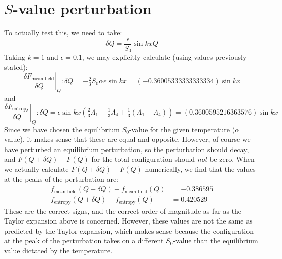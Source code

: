 \documentclass[reqno]{article}
\begin{document}
\section{$S$-value perturbation}
To actually test this, we need to take:
\begin{equation}
    \delta Q
    =
    \frac{\epsilon}{S_0} \sin kx Q
\end{equation}
Taking $k = 1$ and $\epsilon = 0.1$, we may explicitly calculate (using values previously stated):
\begin{equation}
    \left. \frac{\delta F_\text{mean field}}{\delta Q} \right|_Q : \delta Q
    =
    -\tfrac23 S_0 \alpha \epsilon \sin kx 
    =
    (-0.36005333333333334) \sin kx
\end{equation}
and
\begin{equation}
    \left. \frac{\delta F_\text{entropy}}{\delta Q} \right|_Q : \delta Q
    =
    \epsilon \sin kx \left( \tfrac23 \Lambda_1 - \tfrac13 \Lambda_4 + \tfrac13 (\Lambda_1 + \Lambda_4) \right)
    =
    (0.3600595216363576) \sin kx
\end{equation}
Since we have chosen the equilibrium $S_0$-value for the given temperature ($\alpha$ value), it makes sense that these are equal and opposite.
However, of course we have perturbed an equilibrium perturbation, so the perturbation should decay, and $F(Q + \delta Q) - F(Q)$ for the total configuration should \textit{not} be zero.
When we actually calculate $F(Q + \delta Q) - F(Q)$ numerically, we find that the values at the peaks of the perturbation are:
\begin{align}
    f_\text{mean field}(Q + \delta Q) - f_\text{mean field}(Q) &= -0.386595 \\
    f_\text{entropy}(Q + \delta Q) - f_\text{entropy}(Q) &= 0.420529
\end{align}
These are the correct signs, and the correct order of magnitude as far as the Taylor expansion above is concerned.
However, these values are not the same as predicted by the Taylor expansion, which makes sense because the configuration at the peak of the perturbation takes on a different $S_0$-value than the equilibrium value dictated by the temperature.
\end{document}
